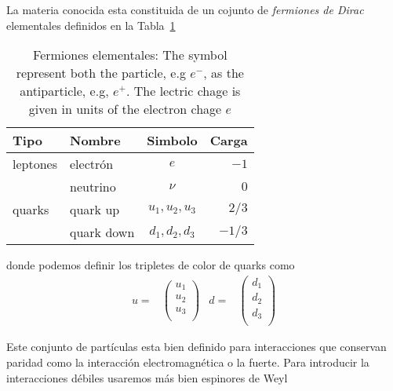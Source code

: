 \begin{frame}
La materia conocida esta constituida de un cojunto de \emph{fermiones de Dirac} elementales definidos en la Tabla~\ref{tab:ef}
\begin{table}
  \centering
  \begin{tabular}{l|l|c|r}
    Tipo &Nombre & Simbolo&Carga\\\hline{}
   leptones& electrón & $e$& $-1$\\
          & neutrino & $\nu$ & $0$\\\hline{}
   quarks &quark up  & $u_1,u_2,u_3$ & $2/3$\\
          &quark down  & $d_1,d_2,d_3$& $-1/3$\\
  \end{tabular}
  \caption{Fermiones elementales:  The symbol represent both the particle, e.g $e^-$, as the antiparticle, e.g, $e^+$. The lectric chage is given in units of the electron chage $e$  }
  \label{tab:ef}
\end{table}
donde podemos definir los tripletes de color de quarks como
\begin{align}
  u=&
  \begin{pmatrix}
    u_1 \\ u_2\\ u_3\\
  \end{pmatrix}
  &d=&
  \begin{pmatrix}
    d_1 \\ d_2 \\ d_3\\
  \end{pmatrix}
\end{align}

Este conjunto de partículas esta bien definido para interacciones que conservan paridad como la interacción electromagnética o la fuerte. Para introducir la interacciones débiles usaremos más bien espinores de Weyl

\end{frame}

